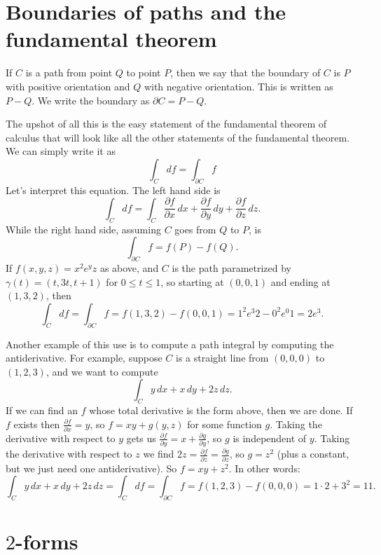 \documentclass[12pt]{article}
\begin{document}
\section*{Boundaries of paths and the fundamental theorem}

If $C$ is a path from point $Q$ to point $P$, then we say that the boundary
of $C$ is $P$ with positive orientation and $Q$ with negative orientation.
This is written as $P-Q$.  We write the boundary as $\partial C = P-Q$.

The upshot of all this is the easy statement of the fundamental theorem
of calculus that will look like all the other statements of the fundamental
theorem.  We can simply write it as
\[
\int_C df = \int_{\partial C} f
\]
Let's interpret this equation.  The left hand side is
\[
\int_C df = \int_C \frac{\partial f}{\partial x}\, dx + 
\frac{\partial f}{\partial y}\, dy + 
\frac{\partial f}{\partial z}\, dz .
\]
While the right hand side, assuming $C$ goes from $Q$ to $P$, is
\[
\int_{\partial C} f = f(P) - f(Q) .
\]
If $f(x,y,z) = 
x^2e^yz$ as above, and $C$ is the path parametrized by
$\gamma(t) = (t,3t,t+1)$ for $0 \leq t \leq 1$, so starting at $(0,0,1)$ and ending
at $(1,3,2)$, then
\[
\int_C df = \int_{\partial C} f = f(1,3,2)-f(0,0,1) = 1^2 e^3 2 - 0^2e^0 1 =
2e^3.
\]

Another example of this use is to compute a path integral by computing the
antiderivative.  For example, suppose $C$ is a straight line from $(0,0,0)$
to $(1,2,3)$, and we want to compute
\begin{equation*}
\int_C y \, dx + x \, dy + 2z \, dz.
\end{equation*}
If we can find an $f$ whose total derivative is the form above, then
we are done.  If $f$ exists then $\frac{\partial f}{\partial x} = y$,
so $f = xy + g(y,z)$ for some function $g$.  Taking the derivative
with respect to $y$ gets us
$\frac{\partial f}{\partial y} = x + \frac{\partial g}{\partial y}$,
so $g$ is independent of $y$.  Taking the derivative with respect
to $z$ we find
$2z = \frac{\partial f}{\partial z} = \frac{\partial g}{\partial z}$,
so $g = z^2$ (plus a constant, but we just need one antiderivative).
So $f = xy+z^2$.  In other words:
\begin{equation*}
\int_C y \, dx + x \, dy + 2z \, dz
=
\int_C df = \int_{\partial C} f
= f(1,2,3) - f(0,0,0) = 1\cdot 2+3^2 = 11.
\end{equation*}

\section*{$2$-forms}
\end{document}
